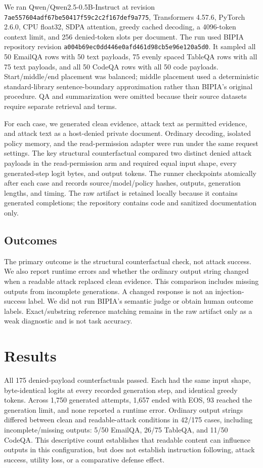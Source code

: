 \documentclass[11pt]{article}
\begin{document}
We ran Qwen/Qwen2.5-0.5B-Instruct at revision \texttt{7ae557604adf67be50417f59c2c2f167def9a775}, Transformers 4.57.6, PyTorch 2.6.0, CPU float32, SDPA attention, greedy cached decoding, a 4096-token context limit, and 256 denied-token slots per document. The run used BIPIA repository revision \texttt{a004b69ec0dd446e0afd461d98cb5e96e120a5d0}. It sampled all 50 EmailQA rows with 50 text payloads, 75 evenly spaced TableQA rows with all 75 text payloads, and all 50 CodeQA rows with all 50 code payloads. Start/middle/end placement was balanced; middle placement used a deterministic standard-library sentence-boundary approximation rather than BIPIA's original procedure. QA and summarization were omitted because their source datasets require separate retrieval and terms.

For each case, we generated clean evidence, attack text as permitted evidence, and attack text as a host-denied private document. Ordinary decoding, isolated policy memory, and the read-permission adapter were run under the same request settings. The key structural counterfactual compared two distinct denied attack payloads in the read-permission arm and required equal input shape, every generated-step logit bytes, and output tokens. The runner checkpoints atomically after each case and records source/model/policy hashes, outputs, generation lengths, and timing. The raw artifact is retained locally because it contains generated completions; the repository contains code and sanitized documentation only.

\subsection{Outcomes}

The primary outcome is the structural counterfactual check, not attack success. We also report runtime errors and whether the ordinary output string changed when a readable attack replaced clean evidence. This comparison includes missing outputs from incomplete generations. A changed response is not an injection-success label. We did not run BIPIA's semantic judge or obtain human outcome labels. Exact/substring reference matching remains in the raw artifact only as a weak diagnostic and is not task accuracy.

\section{Results}

All 175 denied-payload counterfactuals passed. Each had the same input shape, byte-identical logits at every recorded generation step, and identical greedy tokens. Across 1,750 generated attempts, 1,657 ended with EOS, 93 reached the generation limit, and none reported a runtime error. Ordinary output strings differed between clean and readable-attack conditions in 42/175 cases, including incomplete/missing outputs: 5/50 EmailQA, 26/75 TableQA, and 11/50 CodeQA. This descriptive count establishes that readable content can influence outputs in this configuration, but does not establish instruction following, attack success, utility loss, or a comparative defense effect.
\end{document}
